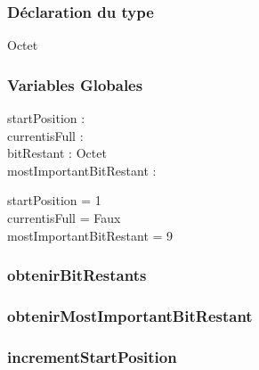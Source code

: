 \subsubsection{Déclaration du type}

\begin{algorithme}
    \begin{enregistrement}{Octet}
    \end{enregistrement}    
\end{algorithme}

\subsubsection{Variables Globales}

startPosition : \entier \\
currentisFull : \booleen \\
bitRestant : Octet \\
mostImportantBitRestant : \entier

startPosition = 1 \\
currentisFull = Faux \\
mostImportantBitRestant = 9\\

\subsubsection{obtenirBitRestants}

\begin{algorithme}
    {}
    {}
    {}
\end{algorithme}


\subsubsection{obtenirMostImportantBitRestant}

\begin{algorithme}
            {}
            {}
            {}
\end{algorithme}

\subsubsection{incrementStartPosition}

